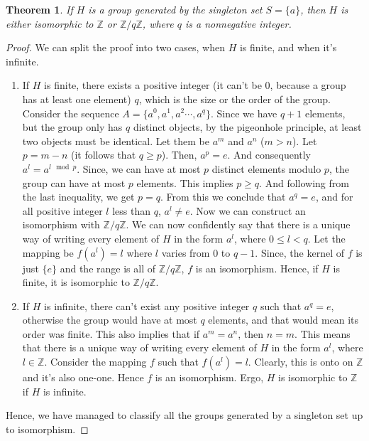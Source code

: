 \documentclass[12pt]{article}
\newtheorem{thm}{Theorem}[section]
\theoremstyle{definition}
\begin{document}
\begin{thm}
\label{class1}
If $H$ is a group generated by the singleton set $S = \{a\}$, then $H$ is either isomorphic to $\mathbb{Z}$ or $\mathbb{Z}/q\mathbb{Z}$, where $q$ is a nonnegative integer.
\end{thm}

\begin{proof}
We can split the proof into two cases, when $H$ is finite, and when it's infinite.
\begin{enumerate}
\item If $H$ is finite, there exists a positive integer (it can't be $0$, because a group has at least one element) $q$, which is the size or the order of the group. Consider the sequence $A = \{a^0, a^1, a^2 \cdots , a^q\}$. Since we have $q+1$ elements, but the group only has $q$ distinct objects, by the pigeonhole principle, at least two objects must be identical. Let them be $a^m$ and $a^n$ ($m>n$). Let $p=m-n$ (it follows that $q \geq p$). Then, $a^p=e$. And consequently $a^l = a^{l \mod p}$. Since, we can have at most $p$ distinct elements modulo $p$, the group can have at most $p$ elements. This implies $p \geq q$. And following from the last inequality, we get $p=q$. From this we conclude that $a^q=e$, and for all positive integer $l$ less than $q$, $a^l \neq e$. Now we can construct an isomorphism with $\mathbb{Z}/q\mathbb{Z}$. We can now confidently say that there is a unique way of writing every element of $H$ in the form $a^l$, where $0 \leq l < q$. Let the mapping be $f(a^l) = l$ where $l$ varies from $0$ to $q-1$. Since, the kernel of $f$ is just $\{e\}$ and the range is all of $\mathbb{Z}/q\mathbb{Z}$, $f$ is an isomorphism. Hence, if $H$ is finite, it is isomorphic to $\mathbb{Z}/q\mathbb{Z}$.

\item If $H$ is infinite, there can't exist any positive integer $q$ such that $a^q=e$, otherwise the group would have at most $q$ elements, and that would mean its order was finite. This also implies that if $a^m = a^n$, then $n=m$. This means that there is a unique way of writing every element of $H$ in the form $a^l$, where $l \in \mathbb{Z}$. Consider the mapping $f$ such that $f(a^l)=l$. Clearly, this is onto on $\mathbb{Z}$ and it's also one-one. Hence $f$ is an isomorphism. Ergo, $H$ is isomorphic to $\mathbb{Z}$ if $H$ is infinite.
\end{enumerate}
Hence, we have managed to classify all the groups generated by a singleton set up to isomorphism.
\end{proof}
\end{document}
